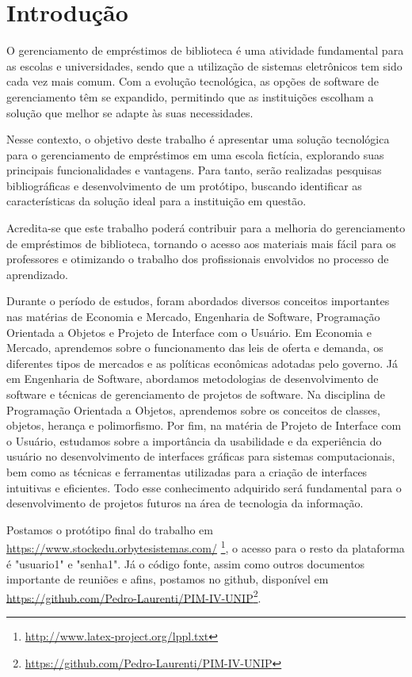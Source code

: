 \documentclass[
	12pt,				%
	openright,			%
	twoside,			%
	a4paper,			%
	english,			%
	french,				%
	spanish,			%
	brazil				%
	]{abntex2}
\begin{document}
\chapter{Introdução}

O gerenciamento de empréstimos de biblioteca é uma atividade fundamental para as escolas e universidades, sendo que a utilização de sistemas eletrônicos tem sido cada vez mais comum. Com a evolução tecnológica, as opções de software de gerenciamento têm se expandido, permitindo que as instituições escolham a solução que melhor se adapte às suas necessidades.

Nesse contexto, o objetivo deste trabalho é apresentar uma solução tecnológica para o gerenciamento de empréstimos em uma escola fictícia, explorando suas principais funcionalidades e vantagens. Para tanto, serão realizadas pesquisas bibliográficas e desenvolvimento de um protótipo, buscando identificar as características da solução ideal para a instituição em questão.

Acredita-se que este trabalho poderá contribuir para a melhoria do gerenciamento de empréstimos de biblioteca, tornando o acesso aos materiais mais fácil para os professores e otimizando o trabalho dos profissionais envolvidos no processo de aprendizado.

Durante o período de estudos, foram abordados diversos conceitos importantes nas matérias de Economia e Mercado, Engenharia de Software, Programação Orientada a Objetos e Projeto de Interface com o Usuário. Em Economia e Mercado, aprendemos sobre o funcionamento das leis de oferta e demanda, os diferentes tipos de mercados e as políticas econômicas adotadas pelo governo. Já em Engenharia de Software, abordamos metodologias de desenvolvimento de software e técnicas de gerenciamento de projetos de software. Na disciplina de Programação Orientada a Objetos, aprendemos sobre os conceitos de classes, objetos, herança e polimorfismo. Por fim, na matéria de Projeto de Interface com o Usuário, estudamos sobre a importância da usabilidade e da experiência do usuário no desenvolvimento de interfaces gráficas para sistemas computacionais, bem como as técnicas e ferramentas utilizadas para a criação de interfaces intuitivas e eficientes. Todo esse conhecimento adquirido será fundamental para o desenvolvimento de projetos futuros na área de tecnologia da informação.

Postamos o protótipo final do trabalho em \url{https://www.stockedu.orbytesistemas.com/} \footnote{\url{http://www.latex-project.org/lppl.txt}}, o acesso para o resto da plataforma é "usuario1" e "senha1". Já o código fonte, assim como outros documentos importante de reuniões e afins, postamos no github, disponível em \url{https://github.com/Pedro-Laurenti/PIM-IV-UNIP}\footnote{\url{https://github.com/Pedro-Laurenti/PIM-IV-UNIP}}.
\end{document}
